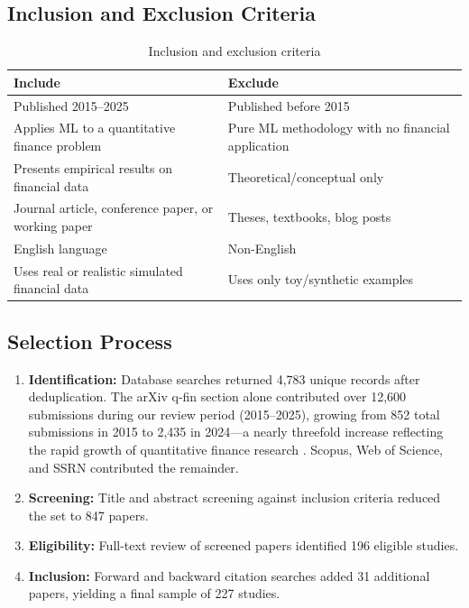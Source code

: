\subsection{Inclusion and Exclusion Criteria}

\begin{table}[H]
\centering
\caption{Inclusion and exclusion criteria}
\label{tab:criteria}
\begin{tabularx}{\textwidth}{lX}
\toprule
\textbf{Include} & \textbf{Exclude} \\
\midrule
Published 2015--2025 & Published before 2015 \\
Applies ML to a quantitative finance problem & Pure ML methodology with no financial application \\
Presents empirical results on financial data & Theoretical/conceptual only \\
Journal article, conference paper, or working paper & Theses, textbooks, blog posts \\
English language & Non-English \\
Uses real or realistic simulated financial data & Uses only toy/synthetic examples \\
\bottomrule
\end{tabularx}
\end{table}

\subsection{Selection Process}

\begin{enumerate}[leftmargin=*]
    \item \textbf{Identification:} Database searches returned 4,783 unique records after deduplication. The arXiv q-fin section alone contributed over 12,600 submissions during our review period (2015--2025), growing from 852 total submissions in 2015 to 2,435 in 2024---a nearly threefold increase reflecting the rapid growth of quantitative finance research \citep{arXivStats2025}. Scopus, Web of Science, and SSRN contributed the remainder.
    \item \textbf{Screening:} Title and abstract screening against inclusion criteria reduced the set to 847 papers.
    \item \textbf{Eligibility:} Full-text review of screened papers identified 196 eligible studies.
    \item \textbf{Inclusion:} Forward and backward citation searches added 31 additional papers, yielding a final sample of 227 studies.
\end{enumerate}

